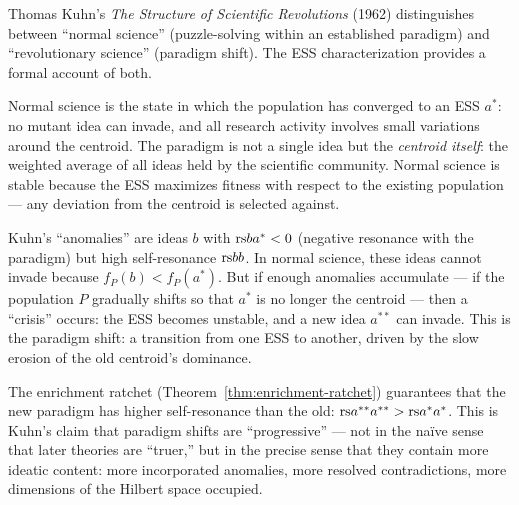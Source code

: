 \begin{interpretation}
\label{interp:ch17:kuhn_paradigm}
Thomas Kuhn's \textit{The Structure of Scientific Revolutions} (1962)
distinguishes between ``normal science'' (puzzle-solving within an
established paradigm) and ``revolutionary science'' (paradigm shift).
The ESS characterization provides a formal account of both.

Normal science is the state in which the population has converged to an
ESS $a^*$: no mutant idea can invade, and all research activity involves
small variations around the centroid.  The paradigm is not a single idea
but the \emph{centroid itself}: the weighted average of all ideas held by
the scientific community.  Normal science is stable because the ESS
maximizes fitness with respect to the existing population --- any
deviation from the centroid is selected against.

Kuhn's ``anomalies'' are ideas $b$ with $\mathrm{rs}{b}{a^*} < 0$ (negative
resonance with the paradigm) but high self-resonance $\mathrm{rs}{b}{b}$.  In
normal science, these ideas cannot invade because $f_P(b) < f_P(a^*)$.
But if enough anomalies accumulate --- if the population $P$ gradually
shifts so that $a^*$ is no longer the centroid --- then a ``crisis''
occurs: the ESS becomes unstable, and a new idea $a^{**}$ can invade.
This is the paradigm shift: a transition from one ESS to another,
driven by the slow erosion of the old centroid's dominance.

The enrichment ratchet (Theorem~\ref{thm:enrichment-ratchet}) guarantees
that the new paradigm has higher self-resonance than the old:
$\mathrm{rs}{a^{**}}{a^{**}} > \mathrm{rs}{a^*}{a^*}$.  This is Kuhn's claim that
paradigm shifts are ``progressive'' --- not in the na\"ive sense that
later theories are ``truer,'' but in the precise sense that they contain
more ideatic content: more incorporated anomalies, more resolved
contradictions, more dimensions of the Hilbert space occupied.
\end{interpretation}

